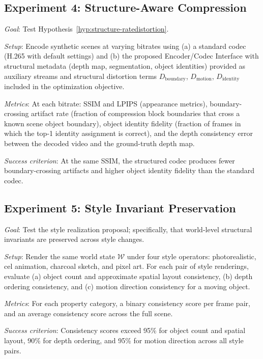 \documentclass[12pt,a4paper]{article}
\theoremstyle{plain}
\theoremstyle{definition}
\theoremstyle{remark}
\begin{document}
\subsection{Experiment 4: Structure-Aware Compression}

\textit{Goal}: Test Hypothesis~\ref{hyp:structure-ratedistortion}.

\textit{Setup}: Encode synthetic scenes at varying bitrates using (a) a standard codec (H.265 with default settings) and (b) the proposed Encoder/Codec Interface with structural metadata (depth map, segmentation, object identities) provided as auxiliary streams and structural distortion terms $D_{\mathrm{boundary}}$, $D_{\mathrm{motion}}$, $D_{\mathrm{identity}}$ included in the optimization objective.

\textit{Metrics}: At each bitrate: SSIM and LPIPS (appearance metrics), boundary-crossing artifact rate (fraction of compression block boundaries that cross a known scene object boundary), object identity fidelity (fraction of frames in which the top-1 identity assignment is correct), and the depth consistency error between the decoded video and the ground-truth depth map.

\textit{Success criterion}: At the same SSIM, the structured codec produces fewer boundary-crossing artifacts and higher object identity fidelity than the standard codec.

\subsection{Experiment 5: Style Invariant Preservation}

\textit{Goal}: Test the style realization proposal; specifically, that world-level structural invariants are preserved across style changes.

\textit{Setup}: Render the same world state $\mathcal{W}$ under four style operators: photorealistic, cel animation, charcoal sketch, and pixel art. For each pair of style renderings, evaluate (a) object count and approximate spatial layout consistency, (b) depth ordering consistency, and (c) motion direction consistency for a moving object.

\textit{Metrics}: For each property category, a binary consistency score per frame pair, and an average consistency score across the full scene.

\textit{Success criterion}: Consistency scores exceed 95\% for object count and spatial layout, 90\% for depth ordering, and 95\% for motion direction across all style pairs.
\end{document}
